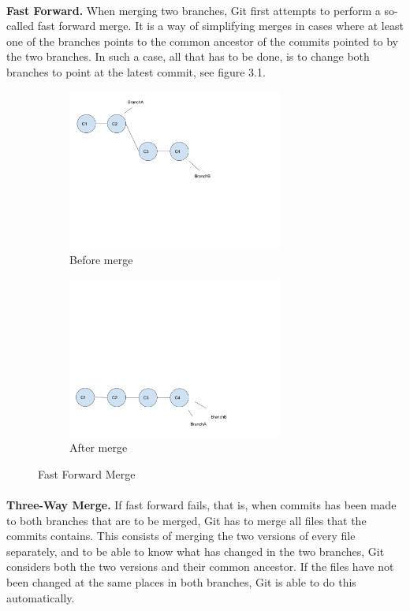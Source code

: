 \paragraph*{}
\textbf{Fast Forward.} When merging two branches, Git first attempts to perform a so-called fast forward merge. It is a way of simplifying merges in cases where at least one of the branches points to the common ancestor of the commits pointed to by the two branches. In such a case, all that has to be done, is to change both branches to point at the latest commit, see figure 3.1.
\begin{figure}[h]
    \centering
    \begin{subfigure}[b]{0.3\textwidth}
        \includegraphics[width=200pt]{figure/ff1.png}
        \caption{Before merge}
        \label{fig:branch1}
    \end{subfigure}
    \begin{subfigure}[b]{0.3\textwidth}
        \includegraphics[width=200pt]{figure/ff2.png}
        \caption{After merge}
        \label{fig:branch3}
    \end{subfigure}
    \caption{Fast Forward Merge}\label{fig:fastforward}
\end{figure}

\paragraph*{}
\textbf{Three-Way Merge.} If fast forward fails, that is, when commits has been made to both branches that are to be merged, Git has to merge all files that the commits contains. This consists of merging the two versions of every file separately, and to be able to know what has changed in the two branches, Git considers both the two versions and their common ancestor. If the files have not been changed at the same places in both branches, Git is able to do this automatically.

